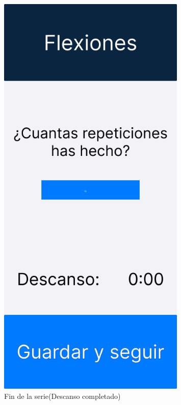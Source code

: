 \begin{figure}[H]
   \centering
   \begin{minipage}{0.45\textwidth}
      \centering
      \includegraphics[width=0.8\textwidth]{fotos/Frame 5.png}
      \caption{Fin de la serie(Descanso completado)}
      \label{fig:Fin de la serie(Descanso completado)}
   \end{minipage}%
   \hspace{0.5cm}
   \begin{minipage}{0.45\textwidth}

\end{minipage}
\end{figure}
